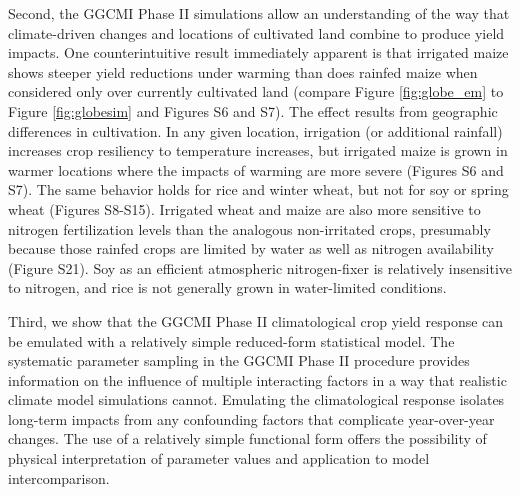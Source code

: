 \documentclass[gmd, manuscript]{copernicus} %
\begin{document}
Second, the GGCMI Phase II simulations allow an understanding of the way that climate-driven changes and locations of cultivated land combine to produce yield impacts. One counterintuitive result immediately apparent is that irrigated maize shows steeper yield reductions under warming than does rainfed maize when considered only over currently cultivated land (compare Figure \ref{fig:globe_em} to Figure \ref{fig:globesim} and Figures S6 and S7). The effect results from geographic differences in cultivation. In any given location, irrigation (or additional rainfall) increases crop resiliency to temperature increases, but irrigated maize is grown in warmer locations where the impacts of warming are more severe (Figures S6 and S7). The same behavior holds for rice and winter wheat, but not for soy or spring wheat (Figures S8-S15). Irrigated wheat and maize are also more sensitive to nitrogen fertilization levels than the analogous non-irritated crops, presumably because those rainfed crops are limited by water as well as nitrogen availability (Figure S21). Soy as an efficient atmospheric nitrogen-fixer is relatively insensitive to nitrogen, and rice is not generally grown in water-limited conditions.

Third, we show that the GGCMI Phase II climatological crop yield response can be emulated with a relatively simple reduced-form statistical model. The systematic parameter sampling in the GGCMI Phase II procedure provides information on the influence of multiple interacting factors in a way that realistic climate model simulations cannot. Emulating the climatological response isolates long-term impacts from any confounding factors that complicate year-over-year changes. The use of a relatively simple functional form offers the possibility of physical interpretation of parameter values and application to model intercomparison.

\end{document}
